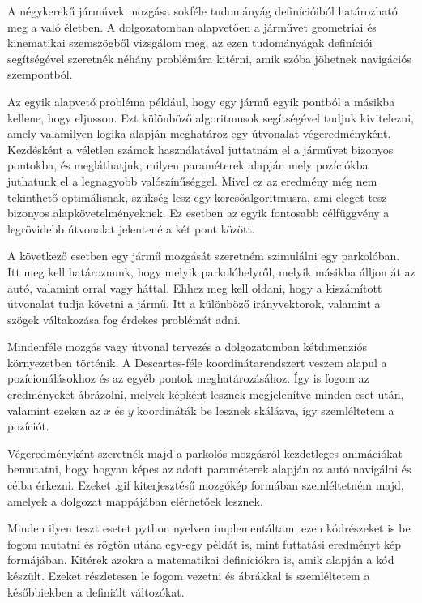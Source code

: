 
A négykerekű járművek mozgása sokféle tudományág definícióiból határozható meg a való életben. A dolgozatomban alapvetően a járművet geometriai és kinematikai szemszögből vizsgálom meg, az ezen tudományágak definíciói segítségével szeretnék néhány problémára kitérni, amik szóba jöhetnek navigációs szempontból.

Az egyik alapvető probléma például, hogy egy jármű egyik pontból a másikba kellene, hogy eljusson. Ezt különböző algoritmusok segítségével tudjuk kivitelezni, amely valamilyen logika alapján meghatároz egy útvonalat végeredményként. Kezdésként a véletlen számok használatával juttatnám el a járművet bizonyos pontokba, és megláthatjuk, milyen paraméterek alapján mely pozíciókba juthatunk el a legnagyobb valószínűséggel. Mivel ez az eredmény még nem tekinthető optimálisnak, szükség lesz egy keresőalgoritmusra, ami eleget tesz bizonyos alapkövetelményeknek. Ez esetben az egyik fontosabb célfüggvény a legrövidebb útvonalat jelentené a két pont között.

A következő esetben egy jármű mozgását szeretném szimulálni egy parkolóban. Itt meg kell határoznunk, hogy melyik parkolóhelyről, melyik másikba álljon át az autó, valamint orral vagy háttal. Ehhez meg kell oldani, hogy a kiszámított útvonalat tudja követni a jármű. Itt a különböző irányvektorok, valamint a szögek váltakozása fog érdekes problémát adni.

Mindenféle mozgás vagy útvonal tervezés a dolgozatomban kétdimenziós környezetben történik. A Descartes-féle koordinátarendszert veszem alapul a pozícionálásokhoz és az egyéb pontok meghatározásához. Így is fogom az eredményeket ábrázolni, melyek képként lesznek megjelenítve minden eset után, valamint ezeken az $ x $ és $ y $ koordináták be lesznek skálázva, így szemléltetem a pozíciót.

Végeredményként szeretnék majd a parkolós mozgásról kezdetleges animációkat bemutatni, hogy hogyan képes az adott paraméterek alapján az autó navigálni és célba érkezni. Ezeket .gif kiterjesztésű mozgókép formában szemléltetném majd, amelyek a dolgozat mappájában elérhetőek lesznek.

Minden ilyen teszt esetet python nyelven implementáltam, ezen kódrészeket is be fogom mutatni és rögtön utána egy-egy példát is, mint futtatási eredményt kép formájában. Kitérek azokra a matematikai definíciókra is, amik alapján a kód készült. Ezeket részletesen le fogom vezetni és ábrákkal is szemléltetem a későbbiekben a definiált változókat.


